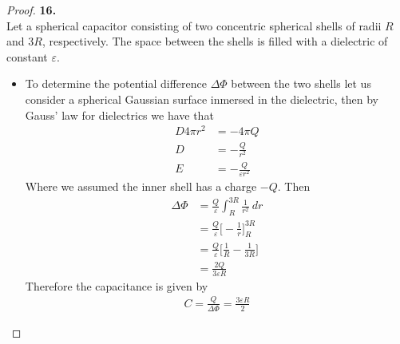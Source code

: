 \documentclass[11pt]{article}
\theoremstyle{definition}
\begin{document}
\cleardoublepage
\begin{proof}{\textbf{16.}}\\
Let a spherical capacitor consisting of two concentric spherical shells of
radii $R$ and $3R$, respectively.
The space between the shells is filled with a dielectric of constant $\varepsilon$.
\begin{itemize}
\item [(a)] To determine the potential difference $\Delta\Phi$ between the two
shells let us consider a spherical Gaussian surface inmersed in the dielectric,
then by Gauss' law for dielectrics we have that
\begin{align*}
    D 4\pi r^2 &= -4\pi Q\\
    D &= -\frac{Q}{r^2}\\
    E &= -\frac{Q}{\varepsilon r^2}
\end{align*}
Where we assumed the inner shell has a charge $-Q$. Then
\begin{align*}
    \Delta \Phi &= \frac{Q}{\varepsilon}\int_{R}^{3R} \frac{1}{r^2}~dr\\
    &= \frac{Q}{\varepsilon}\bigg[-\frac{1}{r}\bigg]_{R}^{3R}\\
    &= \frac{Q}{\varepsilon}\bigg[\frac{1}{R} - \frac{1}{3R}\bigg]\\
    &= \frac{2Q}{3\varepsilon R}
\end{align*}
Therefore the capacitance is given by
\begin{align*}
    C = \frac{Q}{\Delta\Phi} = \frac{3\varepsilon R}{2}
\end{align*}


\end{itemize}
\end{proof}
\end{document}
